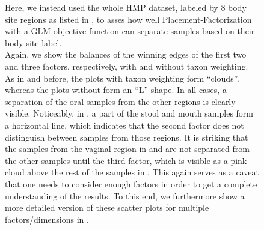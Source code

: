 \begin{figure}[!htb]
{        Here, we instead used the whole \ac{HMP} dataset,
        labeled by \num{8} body site regions as listed in ,
        to asses how well Placement-Factorization with a \ac{GLM} objective function
        can separate samples based on their body site label.
        \\
        Again, we show the balances of the winning edges of the first two and three factors, respectively,
        with and without taxon weighting.
        As in  and 
        before, the plots with taxon weighting form ``clouds'', whereas the plots without form an ``L''-shape.
        In all cases, a separation of the oral samples from the other regions is clearly visible.
        Noticeably, in ,
        a part of the stool and mouth samples form a horizontal line,
        which indicates that the second factor does not distinguish between samples from those regions.
        It is striking that the samples from the vaginal region in
         and
         are not separated from the other samples
        until the third factor, which is visible as a pink cloud above the rest of the samples
        in .
        This again serves as a caveat that one needs to consider enough factors
        in order to get a complete understanding of the results.
        To this end, we furthermore show a more detailed version of these scatter plots for multiple factors/dimensions
        in .
    }
    \label{fig:hmp_pf_all_ordination}
\end{figure}

